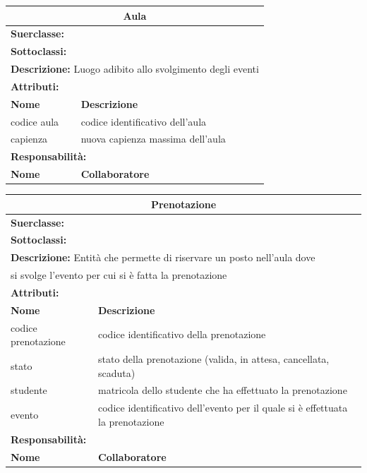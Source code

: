 \documentclass[11pt]{article}
\begin{document}
\begin{table}[H]
\centering
\begin{tabularx}{1\textwidth}{|X|X|}\hline
\multicolumn{2}{|c|}{\textbf{Aula}}\\\hline
\multicolumn{2}{|l|}{\textbf{Suerclasse:} }\\\hline
\multicolumn{2}{|l|}{\textbf{Sottoclassi:} }\\\hline
\multicolumn{2}{|l|}{\textbf{Descrizione:} Luogo adibito allo svolgimento degli eventi}\\\hline
\multicolumn{2}{|l|}{\textbf{Attributi:}}\\
\textbf{Nome} & \textbf{Descrizione}\\
codice aula & codice identificativo dell'aula\\
capienza & nuova capienza massima dell'aula\\
\hline
\multicolumn{2}{|l|}{\textbf{Responsabilità:}}\\
\textbf{Nome} & \textbf{Collaboratore}\\
\hline
\end{tabularx}
\end{table}



\begin{table}[H]
\centering
\begin{tabularx}{1\textwidth}{|X|X|}\hline
\multicolumn{2}{|c|}{\textbf{Prenotazione}}\\\hline
\multicolumn{2}{|l|}{\textbf{Suerclasse:} }\\\hline
\multicolumn{2}{|l|}{\textbf{Sottoclassi:} }\\\hline
\multicolumn{2}{|l|}{\textbf{Descrizione:} Entità che permette di riservare un posto nell'aula dove}\\
\multicolumn{2}{|l|}{si svolge l'evento per cui si è fatta la prenotazione}\\\hline
\multicolumn{2}{|l|}{\textbf{Attributi:}}\\
\textbf{Nome} & \textbf{Descrizione}\\
codice prenotazione & codice identificativo della prenotazione\\
stato & stato della prenotazione (valida, in attesa, cancellata, scaduta)\\
studente & matricola dello studente che ha effettuato la prenotazione\\
evento & codice identificativo dell'evento per il quale si è effettuata la prenotazione\\
\hline
\multicolumn{2}{|l|}{\textbf{Responsabilità:}}\\
\textbf{Nome} & \textbf{Collaboratore}\\
\hline
\end{tabularx}
\end{table}
\end{document}
